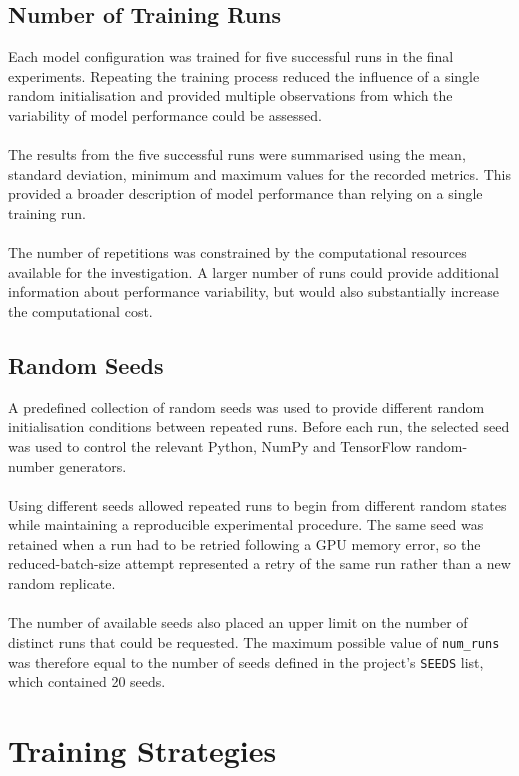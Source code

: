 \documentclass[12pt, a4paper]{report}
\let\oldsection\section
\renewcommand{\section}{%
    \Needspace{6\baselineskip}%
    \oldsection
}
\let\oldsubsection\subsection
\renewcommand{\subsection}{%
    \Needspace{6\baselineskip}%
    \oldsubsection
}
\begin{document}
			\subsection{Number of Training Runs}
				
				Each model configuration was trained for five successful runs in the final experiments. Repeating the training process reduced the influence of a single random initialisation and provided multiple observations from which the variability of model performance could be assessed.\\\\
				The results from the five successful runs were summarised using the mean, standard deviation, minimum and maximum values for the recorded metrics. This provided a broader description of model performance than relying on a single training run.\\\\
				The number of repetitions was constrained by the computational resources available for the investigation. A larger number of runs could provide additional information about performance variability, but would also substantially increase the computational cost.
				
			\newpage
			\subsection{Random Seeds}
				
				A predefined collection of random seeds was used to provide different random initialisation conditions between repeated runs. Before each run, the selected seed was used to control the relevant Python, NumPy and TensorFlow random-number generators.\\\\
				Using different seeds allowed repeated runs to begin from different random states while maintaining a reproducible experimental procedure. The same seed was retained when a run had to be retried following a GPU memory error, so the reduced-batch-size attempt represented a retry of the same run rather than a new random replicate.\\\\
				The number of available seeds also placed an upper limit on the number of distinct runs that could be requested. The maximum possible value of \texttt{num\_runs} was therefore equal to the number of seeds defined in the project's \texttt{SEEDS} list, which contained 20 seeds.
				
		\section{Training Strategies}
		\label{sec:Training_Strategies}
			
\end{document}
